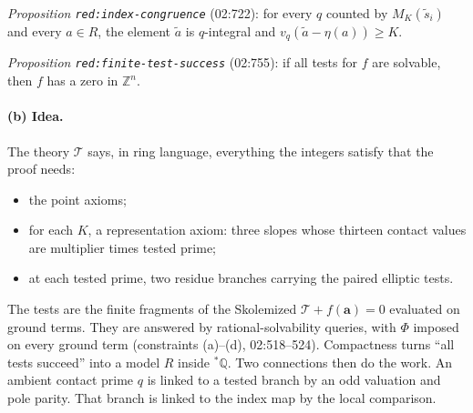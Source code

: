\documentclass[11pt]{article}
\theoremstyle{definition}
\newcommand{\Q}{\mathbb Q}
\newcommand{\Z}{\mathbb Z}
\newcommand{\sQ}{{}^*\Q}
\newcommand{\lbl}[1]{\texttt{#1}}
\newcommand{\src}[1]{\textsf{#1}}
\begin{document}
\emph{Proposition \lbl{red:index-congruence}} (\src{02:722}):
for every $q$ counted by $M_K(\widetilde s_i)$ and every $a\in R$, the
element $\widetilde a$ is $q$-integral and $v_q(\widetilde a-\eta(a))\ge K$.

\emph{Proposition \lbl{red:finite-test-success}} (\src{02:755}):
if all tests for $f$ are solvable, then $f$ has a zero in $\Z^n$.

\paragraph{(b) Idea.}
The theory $\mathcal T$ says, in ring language, everything the integers
satisfy that the proof needs:
\begin{itemize}
\item the point axioms;
\item for each $K$, a representation axiom: three slopes whose thirteen
contact values are multiplier times tested prime;
\item at each tested prime, two residue branches carrying the paired
elliptic tests.
\end{itemize}
The tests are the finite fragments of the Skolemized $\mathcal T+f(\mathbf a)=0$
evaluated on ground terms.  They are answered by rational-solvability queries,
with $\Phi$ imposed on every ground term (constraints (a)--(d),
\src{02:518--524}).  Compactness \cite{Marker2002} turns ``all tests succeed'' into a model
$R$ inside $\sQ$.  Two connections then do the work.  An ambient contact
prime $q$ is linked to a tested branch by an odd valuation and pole parity.
That branch is linked to the index map by the local comparison.
\end{document}
